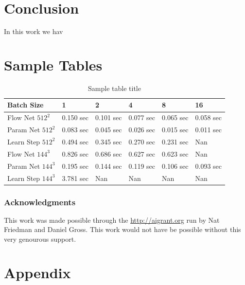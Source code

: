 \documentclass{article} %
\begin{document}
\section{Conclusion}

In this work we hav


\section{Sample Tables}

\begin{table}[t]
\caption{Sample table title}
\label{sample-table}
\begin{center}
\begin{tabular}{l|lllll}
Batch Size & 1 & 2 & 4 & 8 & 16 \\ \hline 
Flow Net $512^2$ & 0.150 sec & 0.101 sec & 0.077 sec & 0.065 sec & 0.058 sec \\ 
Param Net $512^2$ & 0.083 sec & 0.045 sec & 0.026 sec & 0.015 sec & 0.011 sec \\ 
Learn Step $512^2$ & 0.494 sec & 0.345 sec & 0.270 sec & 0.231 sec & Nan \\ 
Flow Net $144^3$ & 0.826 sec & 0.686 sec & 0.627 sec & 0.623 sec & Nan \\ 
Param Net $144^3$ & 0.195 sec & 0.144 sec & 0.119 sec & 0.106 sec & 0.093 sec \\ 
Learn Step $144^3$ & 3.781 sec & Nan & Nan & Nan & Nan \\ 
\end{tabular}
\end{center}
\end{table}


\subsubsection*{Acknowledgments}

This work was made possible through the \url{http://aigrant.org} run by Nat Friedman and Daniel Gross. This work would not have be possible without this very genourous support.




\section{Appendix}
\end{document}
